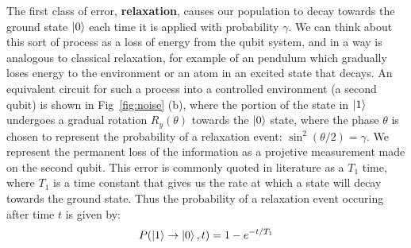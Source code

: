 The first class of error, \textbf{relaxation}, causes our population to decay towards the ground state $\ket{0}$ each time it is
applied with probability $\gamma$. We can think about this sort of process as a loss of energy from the qubit system, and
in a way is analogous to classical relaxation, for example of an pendulum which gradually loses energy to the environment
or an atom in an excited state that decays. An equivalent circuit for such a process into a controlled environment (a second qubit) is
shown in Fig~\ref{fig:noise} (b), where the portion of the state in $\ket{1}$ undergoes a gradual rotation $R_{y}(\theta)$
towards the $\ket{0}$ state, where the phase $\theta$ is chosen to represent the probability of a relaxation event:
$\sin^2(\theta/2) = \gamma$. We represent the permanent loss of the information as a projetive measurement made on the
second qubit. This error is commonly quoted in literature as a $T_1$ time, where $T_1$ is a time constant
that gives us the rate at which a state will decay towards the ground state. Thus the probability of a relaxation event occuring
after time $t$ is given by:
\begin{equation}
  P(\ket{1} \rightarrow \ket{0}, t) = 1 - e^{-t/T_1}
\end{equation}

